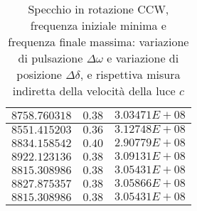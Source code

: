 \documentclass{article} %
\begin{document}
\begin{table}
\begin{tabular}{||c|c|c||}
            $8758.760318$ & $0.38$ & $3.03471E+08$ \\\hline
            $8551.415203$ & $0.36$ & $3.12748E+08$ \\\hline
            $8834.158542$ & $0.40$ & $2.90779E+08$ \\\hline
            $8922.123136$ & $0.38$ & $3.09131E+08$ \\\hline
            $8815.308986$ & $0.38$ & $3.05431E+08$ \\\hline
            $8827.875357$ & $0.38$ & $3.05866E+08$ \\\hline
            $8815.308986$ & $0.38$ & $3.05431E+08$ \\\hline
        \end{tabular}
        \caption{Specchio in rotazione CCW, frequenza iniziale minima e frequenza finale massima: variazione di pulsazione $\Delta\omega$ e variazione di posizione $\Delta\delta$, e rispettiva misura indiretta della velocità della luce $c$}
        \label{CCW_min_max}
    \end{table}
\end{document}

